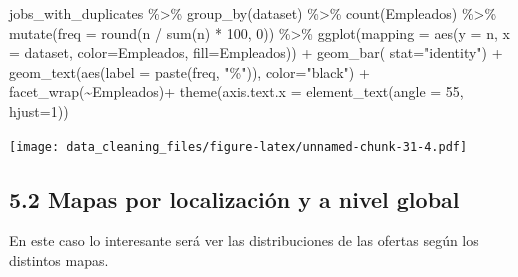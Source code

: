 \documentclass[
]{article}
\newenvironment{Shaded}{\begin{snugshade}}{\end{snugshade}}
\newcommand{\DataTypeTok}[1]{\textcolor[rgb]{0.87,0.87,0.75}{#1}}
\newcommand{\DecValTok}[1]{\textcolor[rgb]{0.86,0.86,0.80}{#1}}
\newcommand{\KeywordTok}[1]{\textcolor[rgb]{0.94,0.87,0.69}{#1}}
\newcommand{\NormalTok}[1]{\textcolor[rgb]{0.80,0.80,0.80}{#1}}
\newcommand{\OperatorTok}[1]{\textcolor[rgb]{0.94,0.94,0.82}{#1}}
\newcommand{\StringTok}[1]{\textcolor[rgb]{0.80,0.58,0.58}{#1}}
\begin{document}
\begin{Shaded}
\begin{Highlighting}[]
\NormalTok{jobs\_with\_duplicates }\OperatorTok{\%\textgreater{}\%}\StringTok{ }
\StringTok{  }\KeywordTok{group\_by}\NormalTok{(dataset) }\OperatorTok{\%\textgreater{}\%}\StringTok{ }
\StringTok{  }\KeywordTok{count}\NormalTok{(Empleados) }\OperatorTok{\%\textgreater{}\%}
\StringTok{  }\KeywordTok{mutate}\NormalTok{(}\DataTypeTok{freq =} \KeywordTok{round}\NormalTok{(n }\OperatorTok{/}\StringTok{ }\KeywordTok{sum}\NormalTok{(n) }\OperatorTok{*}\StringTok{ }\DecValTok{100}\NormalTok{, }\DecValTok{0}\NormalTok{)) }\OperatorTok{\%\textgreater{}\%}\StringTok{ }
\StringTok{  }\KeywordTok{ggplot}\NormalTok{(}\DataTypeTok{mapping =} \KeywordTok{aes}\NormalTok{(}\DataTypeTok{y =}\NormalTok{ n, }\DataTypeTok{x =}\NormalTok{ dataset, }\DataTypeTok{color=}\NormalTok{Empleados, }\DataTypeTok{fill=}\NormalTok{Empleados)) }\OperatorTok{+}\StringTok{ }\KeywordTok{geom\_bar}\NormalTok{( }\DataTypeTok{stat=}\StringTok{"identity"}\NormalTok{) }\OperatorTok{+}\StringTok{ }\KeywordTok{geom\_text}\NormalTok{(}\KeywordTok{aes}\NormalTok{(}\DataTypeTok{label =} \KeywordTok{paste}\NormalTok{(freq, }\StringTok{"\%"}\NormalTok{)), }\DataTypeTok{color=}\StringTok{"black"}\NormalTok{) }\OperatorTok{+}\StringTok{ }\KeywordTok{facet\_wrap}\NormalTok{(}\OperatorTok{\textasciitilde{}}\NormalTok{Empleados)}\OperatorTok{+}\StringTok{ }\KeywordTok{theme}\NormalTok{(}\DataTypeTok{axis.text.x =} \KeywordTok{element\_text}\NormalTok{(}\DataTypeTok{angle =} \DecValTok{55}\NormalTok{, }\DataTypeTok{hjust=}\DecValTok{1}\NormalTok{))}
\end{Highlighting}
\end{Shaded}

\texttt{[image: data\_cleaning\_files/figure-latex/unnamed-chunk-31-4.pdf]}

\hypertarget{mapas-por-localizaciuxf3n-y-a-nivel-global}{%
\subsection{5.2 Mapas por localización y a nivel
global}\label{mapas-por-localizaciuxf3n-y-a-nivel-global}}

En este caso lo interesante será ver las distribuciones de las ofertas
según los distintos mapas.
\end{document}
